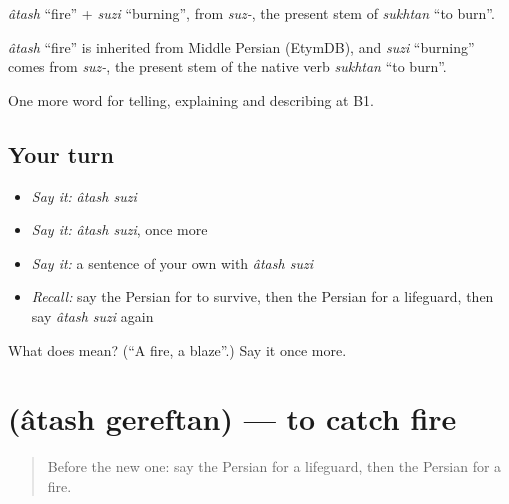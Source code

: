 \emph{âtash} \textquotedblleft{}fire\textquotedblright{} + \emph{suzi} \textquotedblleft{}burning\textquotedblright{}, from \emph{suz-}, the present stem of \emph{sukhtan} \textquotedblleft{}to burn\textquotedblright{}.

\begin{cousinweb}
\emph{âtash} \textquotedblleft{}fire\textquotedblright{} is inherited from Middle Persian (EtymDB), and \emph{suzi} \textquotedblleft{}burning\textquotedblright{} comes from \emph{suz-}, the present stem of the native verb \emph{sukhtan} \textquotedblleft{}to burn\textquotedblright{}.
\end{cousinweb}

\begin{grammarlens}[title={What you've built}]
One more word for telling, explaining and describing at B1.
\end{grammarlens}

\subsection*{Your turn}
\begin{itemize}
\raggedright
  \item \emph{Say it:} \emph{âtash suzi}
  \item \emph{Say it:} \emph{âtash suzi}, once more
  \item \emph{Say it:} a sentence of your own with \emph{âtash suzi}
  \item \emph{Recall:} say the Persian for to survive, then the Persian for a lifeguard, then say \emph{âtash suzi} again
\end{itemize}

\begin{tcolorbox}[breakable,colback=teal!4,colframe=teal!35!black,title={Before you move on}]
What does   mean? (\textquotedblleft{}A fire, a blaze\textquotedblright{}.) Say it once more.
\end{tcolorbox}
\section[\texorpdfstring{\fa{آتش} \fa{گرفتن} (âtash gereftan)}{آتش گرفتن (âtash gereftan)}]{  (âtash gereftan) — to catch fire}

\label{lesson:FA-C328-atash-gereftan}



\begin{quote}
Before the new one: say the Persian for a lifeguard, then the Persian for a fire.
\end{quote}

